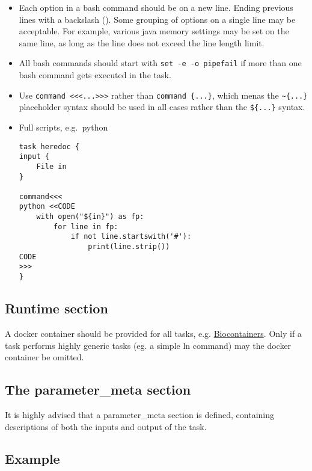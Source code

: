 \documentclass[
]{book}
\begin{document}
\begin{itemize}
\item
  Each option in a bash command should be on a new line. Ending previous lines
  with a backslash (). Some grouping of options on a single line may be
  acceptable. For example, various java memory settings may be set on the same
  line, as long as the line does not exceed the line length limit.
\item
  All bash commands should start with \texttt{set\ -e\ -o\ pipefail} if more than one bash
  command gets executed in the task.
\item
  Use \texttt{command\ \textless{}\textless{}\textless{}...\textgreater{}\textgreater{}\textgreater{}} rather than \texttt{command\ \{...\}}, which menas the \texttt{\textasciitilde{}\{...\}}\\
  placeholder syntax should be used in all cases rather than the \texttt{\$\{...\}}
  syntax.
\item
  Full scripts, e.g.~python

\begin{verbatim}
task heredoc {
input {
    File in
}

command<<<
python <<CODE
    with open("${in}") as fp:
        for line in fp:
            if not line.startswith('#'):
                print(line.strip())
CODE
>>>
}
\end{verbatim}
\end{itemize}

\hypertarget{runtime-section}{%
\subsection{Runtime section}\label{runtime-section}}

A docker container should be provided for all tasks, e.g.
\href{https://biocontainers.pro/}{Biocontainers}. Only if a task performs highly
generic tasks (eg. a simple ln command) may the docker container be omitted.

\hypertarget{the-parameter_meta-section}{%
\subsection{The parameter\_meta section}\label{the-parameter_meta-section}}

It is highly advised that a parameter\_meta section is defined, containing
descriptions of both the inputs and output of the task.

\hypertarget{example-1}{%
\subsection{Example}\label{example-1}}
\end{document}
